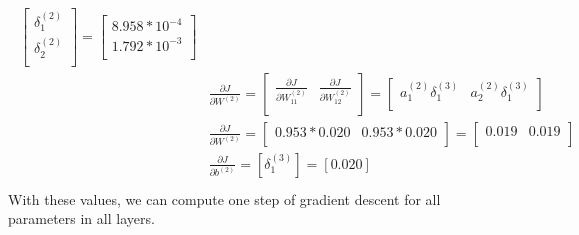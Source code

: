 \documentclass[leqno]{article}
\begin{document}
\begin{gather*}
\begin{split}
\begin{bmatrix}
   \delta_1^{(2)}\\ 
   \delta_2^{(2)}\\
  \end{bmatrix}
  =
  \begin{bmatrix}
   8.958*10^{-4}\\ 
   1.792*10^{-3}\\
  \end{bmatrix}
\\
&\frac{\partial J}{\partial W^{(2)}} = 
 \begin{bmatrix}
   \frac{\partial J}{\partial W_{11}^{(2)}} & \frac{\partial J}{\partial W_{12}^{(2)}}\\ 
  \end{bmatrix}
  =
 \begin{bmatrix}
   a_1^{(2)}\delta_1^{(3)} & a_2^{(2)}\delta_1^{(3)}\\ 
  \end{bmatrix}
\\
&\frac{\partial J}{\partial W^{(2)}}   =
  \begin{bmatrix}
   0.953*0.020 & 0.953*0.020\\ 
  \end{bmatrix}
  =
  \begin{bmatrix}
   0.019 & 0.019\\
  \end{bmatrix}
\\
&\frac{\partial J}{\partial b^{(2)}} = [\delta_1^{(3)}] = [0.020]\\
\end{split}
\end{gather*}
With these values, we can compute one step of gradient descent for all parameters in all layers.
\end{document}
